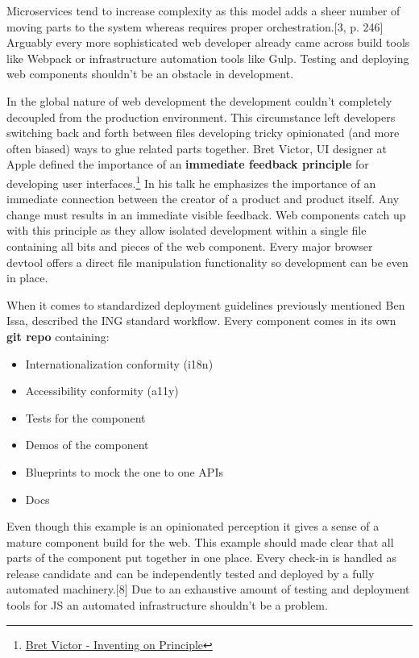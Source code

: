 \documentclass[]{article}
\providecommand{\tightlist}{%
  \setlength{\itemsep}{0pt}\setlength{\parskip}{0pt}}
\begin{document}
Microservices tend to increase complexity as this model adds a sheer
number of moving parts to the system whereas requires proper
orchestration.{[}3, p. 246{]} Arguably every more sophisticated web
developer already came across build tools like Webpack or infrastructure
automation tools like Gulp. Testing and deploying web components
shouldn't be an obstacle in development.

In the global nature of web development the development couldn't
completely decoupled from the production environment. This circumstance
left developers switching back and forth between files developing tricky
opinionated (and more often biased) ways to glue related parts together.
Bret Victor, UI designer at Apple defined the importance of an
\textbf{immediate feedback principle} for developing user
interfaces.\footnote{\href{https://vimeo.com/36579366}{Bret Victor -
  Inventing on Principle}} In his talk he emphasizes the importance of
an immediate connection between the creator of a product and product
itself. Any change must results in an immediate visible feedback. Web
components catch up with this principle as they allow isolated
development within a single file containing all bits and pieces of the
web component. Every major browser devtool offers a direct file
manipulation functionality so development can be even in place.

When it comes to standardized deployment guidelines previously mentioned
Ben Issa, described the ING standard workflow. Every component comes in
its own \textbf{git repo} containing:

\begin{itemize}
\tightlist
\item
  Internationalization conformity (i18n)
\item
  Accessibility conformity (a11y)
\item
  Tests for the component
\item
  Demos of the component
\item
  Blueprints to mock the one to one APIs
\item
  Docs
\end{itemize}

Even though this example is an opinionated perception it gives a sense
of a mature component build for the web. This example should made clear
that all parts of the component put together in one place. Every
check-in is handled as release candidate and can be independently tested
and deployed by a fully automated machinery.{[}8{]} Due to an exhaustive
amount of testing and deployment tools for JS an automated
infrastructure shouldn't be a problem.
\end{document}

